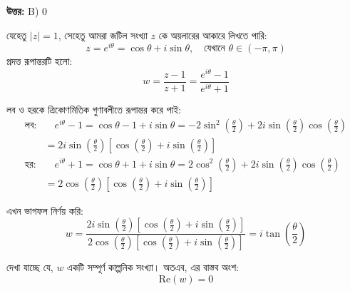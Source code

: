 \documentclass[12pt, a4paper]{article}
\begin{document}
\vspace{0.5em}
\begin{tcolorbox}[answerbox]
    \textbf{\color{success} উত্তর:} B) $0$
\end{tcolorbox}
\vspace{1em}

\begin{tcolorbox}[solutionbox={সমাধান (Solution)}]
    \noindent
    যেহেতু $|z| = 1$, সেহেতু আমরা জটিল সংখ্যা $z$ কে অয়লারের আকারে লিখতে পারি:
    \[ z = e^{i\theta} = \cos\theta + i\sin\theta, \quad \text{যেখানে } \theta \in (-\pi, \pi) \]
    প্রদত্ত রূপান্তরটি হলো:
    \[ w = \frac{z-1}{z+1} = \frac{e^{i\theta}-1}{e^{i\theta}+1} \]
    
    \vspace{0.5em}
    লব ও হরকে ত্রিকোণমিতিক গুণাবলীতে রূপান্তর করে পাই:
    \begin{align*}
        \text{লব:} &\quad e^{i\theta} - 1 = \cos\theta - 1 + i\sin\theta = -2\sin^2\left(\frac{\theta}{2}\right) + 2i\sin\left(\frac{\theta}{2}\right)\cos\left(\frac{\theta}{2}\right) \\
        &= 2i\sin\left(\frac{\theta}{2}\right)\left[\cos\left(\frac{\theta}{2}\right) + i\sin\left(\frac{\theta}{2}\right)\right] \\
        \text{হর:} &\quad e^{i\theta} + 1 = \cos\theta + 1 + i\sin\theta = 2\cos^2\left(\frac{\theta}{2}\right) + 2i\sin\left(\frac{\theta}{2}\right)\cos\left(\frac{\theta}{2}\right) \\
        &= 2\cos\left(\frac{\theta}{2}\right)\left[\cos\left(\frac{\theta}{2}\right) + i\sin\left(\frac{\theta}{2}\right)\right]
    \end{align*}
    
    \vspace{0.5em}
    এখন ভাগফল নির্ণয় করি:
    \[ w = \frac{2i\sin\left(\frac{\theta}{2}\right)\left[\cos\left(\frac{\theta}{2}\right) + i\sin\left(\frac{\theta}{2}\right)\right]}{2\cos\left(\frac{\theta}{2}\right)\left[\cos\left(\frac{\theta}{2}\right) + i\sin\left(\frac{\theta}{2}\right)\right]} = i\tan\left(\frac{\theta}{2}\right) \]
    
    \vspace{0.5em}
    দেখা যাচ্ছে যে, $w$ একটি সম্পূর্ণ কাল্পনিক সংখ্যা। অতএব, এর বাস্তব অংশ:
    \[ \text{Re}(w) = 0 \]
\end{tcolorbox}
\end{document}
